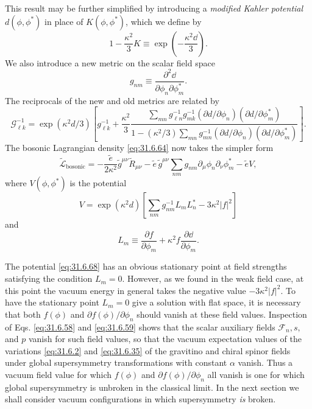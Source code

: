 This result may be further simplified by introducing a \emph{modified
Kahler potential} \(d(\phi,\phi^*)\) in place of \(K(\phi,\phi^*)\),
which we define by
\begin{equation}
  1-\frac{\kappa^2}{3}K
  \equiv\exp\left(-\frac{\kappa^2\dd}{3}\right).
  \tag{31.6.65}\label{eq:31.6.65}
\end{equation}
We also introduce a new metric on the scalar field space
\begin{equation}
  g_{nm}\equiv
  \frac{\partial^2\dd}{\partial\phi_n\partial\phi_m^*}.
  \tag{31.6.66}\label{eq:31.6.66}
\end{equation}
The reciprocals of the new and old metrics are related by
\[
  \mathcal G^{-1}_{\ell k}
  =\exp(\kappa^2d/3)\left[
    g^{-1}_{\ell k}
    +\frac{\kappa^2}{3}
     \frac{
       \displaystyle\sum_{mn}
       g^{-1}_{\ell n}g^{-1}_{mk}
       (\partial d/\partial\phi_n)
       (\partial d/\partial\phi_m^*)
     }{
       \displaystyle
       1-(\kappa^2/3)\sum_{mn}
       g^{-1}_{mn}
       (\partial d/\partial\phi_n)
       (\partial d/\partial\phi_m^*)
     }
  \right].
\]
The bosonic Lagrangian density \eqref{eq:31.6.64} now takes the simpler
form
\begin{equation}
  \widetilde{\mathcal L}_{\mathrm{bosonic}}
  =-\frac{\widetilde e}{2\kappa^2}
    \widetilde g^{\mu\nu}\widetilde R_{\mu\nu}
   -\widetilde e\,\widetilde g^{\mu\nu}
    \sum_{nm}g_{nm}\partial_\mu\phi_n\partial_\nu\phi_m^*
   -\widetilde eV,
  \tag{31.6.67}\label{eq:31.6.67}
\end{equation}
where \(V(\phi,\phi^*)\) is the potential
\begin{equation}
  V
  =\exp(\kappa^2d)\left[
    \sum_{nm}g^{-1}_{nm}L_mL_n^*
    -3\kappa^2|f|^2
  \right]
  \tag{31.6.68}\label{eq:31.6.68}
\end{equation}
and
\begin{equation}
  L_m\equiv
  \frac{\partial f}{\partial\phi_m}
  +\kappa^2f\frac{\partial \dd}{\partial\phi_m}.
  \tag{31.6.69}\label{eq:31.6.69}
\end{equation}

The potential \eqref{eq:31.6.68} has an obvious stationary point at
field strengths satisfying the condition \(L_m=0\). However, as we
found in the weak field case, at this point the vacuum energy in general
takes the negative value \(-3\kappa^2|f|^2\). To have the stationary
point \(L_m=0\) give a solution with flat space, it is necessary that
both \(f(\phi)\) and \(\partial f(\phi)/\partial\phi_n\) should vanish at
these field values. Inspection of Eqs. \eqref{eq:31.6.58} and
\eqref{eq:31.6.59} shows that the scalar auxiliary fields
\(\mathcal F_n,s,\) and \(p\) vanish for such field values, so that the
vacuum expectation values of the variations \eqref{eq:31.6.2} and
\eqref{eq:31.6.35} of the gravitino and chiral spinor fields under
global supersymmetry transformations with constant \(\alpha\) vanish.
Thus a vacuum field value for which \(f(\phi)\) and
\(\partial f(\phi)/\partial\phi_n\) all vanish is one for which global
supersymmetry is unbroken in the classical limit. In the next section
we shall consider vacuum configurations in which supersymmetry
\emph{is} broken.

